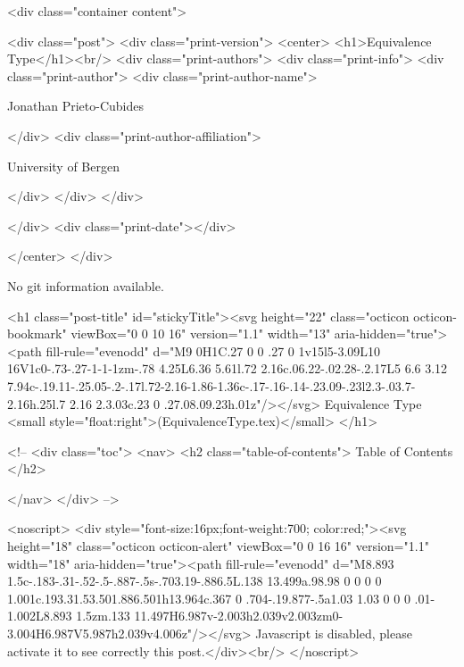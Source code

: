       <div class="container content">
        







<div class="post">
  <div class="print-version">
    <center>
      <h1>Equivalence Type</h1><br/>
        <div class="print-authors">
          <div class="print-info">
            <div class="print-author">
              <div class="print-author-name">
                
                  Jonathan Prieto-Cubides
                
              </div>
              <div class="print-author-affiliation">
                
                  University of Bergen
                
                </div>
            </div>
          </div>
          
          
        </div>
        <div class="print-date"></div>
        
        
    </center>
  </div>

  
  No git information available.
  

  <h1 class="post-title" id="stickyTitle"><svg height="22" class="octicon octicon-bookmark" viewBox="0 0 10 16" version="1.1" width="13" aria-hidden="true"><path fill-rule="evenodd" d="M9 0H1C.27 0 0 .27 0 1v15l5-3.09L10 16V1c0-.73-.27-1-1-1zm-.78 4.25L6.36 5.61l.72 2.16c.06.22-.02.28-.2.17L5 6.6 3.12 7.94c-.19.11-.25.05-.2-.17l.72-2.16-1.86-1.36c-.17-.16-.14-.23.09-.23l2.3-.03.7-2.16h.25l.7 2.16 2.3.03c.23 0 .27.08.09.23h.01z"/></svg> Equivalence Type <small style="float:right">(EquivalenceType.tex)</small>
  </h1>

  <!-- 
  <div class="toc">
    <nav>
    <h2 class="table-of-contents"> Table of Contents </h2>
      

    </nav>
  </div>
   -->

  <noscript>
  <div style="font-size:16px;font-weight:700; color:red;"><svg height="18" class="octicon octicon-alert" viewBox="0 0 16 16" version="1.1" width="18" aria-hidden="true"><path fill-rule="evenodd" d="M8.893 1.5c-.183-.31-.52-.5-.887-.5s-.703.19-.886.5L.138 13.499a.98.98 0 0 0 0 1.001c.193.31.53.501.886.501h13.964c.367 0 .704-.19.877-.5a1.03 1.03 0 0 0 .01-1.002L8.893 1.5zm.133 11.497H6.987v-2.003h2.039v2.003zm0-3.004H6.987V5.987h2.039v4.006z"/></svg> Javascript is disabled, please activate it to see correctly this post.</div><br/>
  </noscript>


